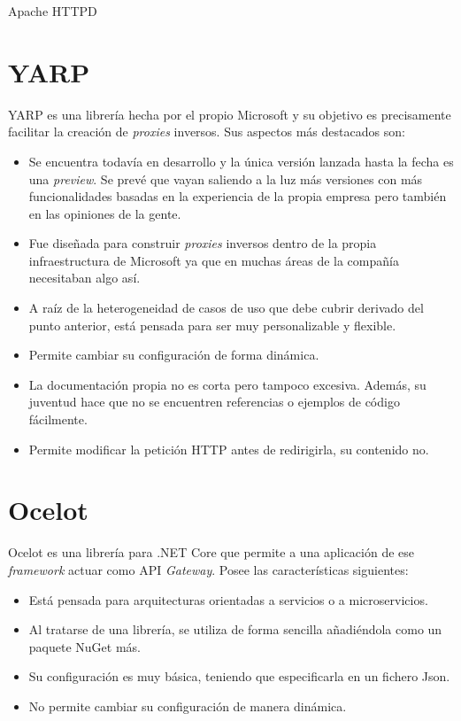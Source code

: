 \documentclass[11pt,spanish,listoffigures]{tfgetsinf}
\begin{document}
Apache HTTPD \cite{Apache}


\section{YARP}

YARP \cite{YARP} es una librería hecha por el propio Microsoft y su objetivo es precisamente facilitar la creación de \emph{proxies} inversos. Sus aspectos más destacados son:

\begin{itemize}

\item Se encuentra todavía en desarrollo y la única versión lanzada hasta la fecha es una \emph{preview}. Se prevé que vayan saliendo a la luz más versiones con más funcionalidades basadas en la experiencia de la propia empresa pero también en las opiniones de la gente.
\item Fue diseñada para construir \emph{proxies} inversos dentro de la propia infraestructura de Microsoft ya que en muchas áreas de la compañía necesitaban algo así.
\item A raíz de la heterogeneidad de casos de uso que debe cubrir derivado del punto anterior, está pensada para ser muy personalizable y flexible.
\item Permite cambiar su configuración de forma dinámica.
\item La documentación propia no es corta pero tampoco excesiva. Además, su juventud hace que no se encuentren referencias o ejemplos de código fácilmente.
\item Permite modificar la petición HTTP antes de redirigirla, su contenido no.

\end{itemize}


\section{Ocelot}
Ocelot \cite{Ocelot} es una librería para .NET Core que permite a una aplicación de ese \emph{framework} actuar como API \emph{Gateway}. Posee las características siguientes:

\begin{itemize}

\item Está pensada para arquitecturas orientadas a servicios o a microservicios.
\item Al tratarse de una librería, se utiliza de forma sencilla añadiéndola como un paquete NuGet más.
\item Su configuración es muy básica, teniendo que especificarla en un fichero Json.
\item No permite cambiar su configuración de manera dinámica.

\end{itemize}
\end{document}
